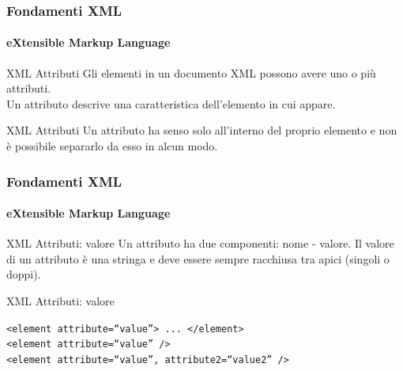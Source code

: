 



\begin{frame}
    \frametitle{Fondamenti XML}
    \framesubtitle{eXtensible Markup Language}
    \addtocounter{nframe}{1}

	\begin{block}{XML Attributi}
		Gli elementi in un documento XML possono avere uno o più attributi.
		\\ Un attributo descrive una caratteristica dell'elemento in cui appare.
	\end{block}

	\begin{block}{XML Attributi}
		Un attributo ha senso solo all'interno del proprio elemento e non è possibile separarlo da esso in alcun modo.
	\end{block}

\end{frame}


\begin{frame}
    \frametitle{Fondamenti XML}
    \framesubtitle{eXtensible Markup Language}
    \addtocounter{nframe}{1}

	\begin{block}{XML Attributi: valore}
		Un attributo ha due componenti: nome - valore.
		Il valore di un attributo è una stringa e deve essere sempre racchiusa tra apici (singoli o doppi).
	\end{block}

	\begin{block}{XML Attributi: valore}
		\begin{center}
			\texttt{<element attribute=``value''> ... </element>}
			\\\texttt{<element attribute=``value'' />}
			\\\texttt{<element attribute=``value'', attribute2=``value2'' />}
		\end{center}
	\end{block}

\end{frame}

